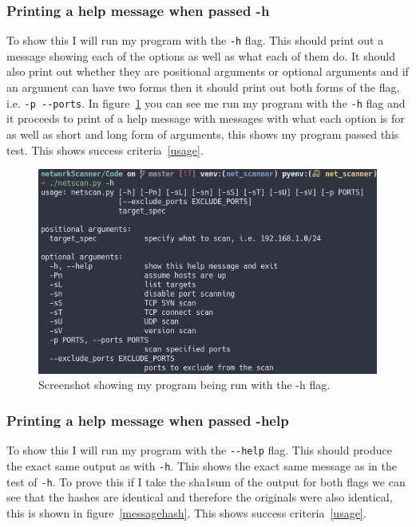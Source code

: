 \documentclass[titlepage]{article}
\let\Oldsubsubsection\subsubsection{}
\renewcommand{\subsubsection}{\FloatBarrier\Oldsubsubsection}
\begin{document}
\subsubsection{Printing a help message when passed -h}

To show this I will run my program with the \verb|-h| flag.
This should print out a message showing each of the options as well as what each of them do.
It should also print out whether they are positional arguments or optional arguments and if
an argument can have two forms then it should print out both forms of the flag, i.e. \verb|-p --ports|.
In figure~\ref{hflagtest} you can see me run my program with the \verb|-h| flag and it proceeds to
print of a help message with messages with what each option is for as well as short and long form of
arguments, this shows my program passed this test.
This shows success criteria~\ref{usage}.

\begin{figure}[H]
  \centering
  \includegraphics[width=\textwidth]{screenshots/hmessage.png}
  \caption{%
    Screenshot showing my program being run with the -h flag.
  }\label{hflagtest}
\end{figure}

\subsubsection{Printing a help message when passed -help}
To show this I will run my program with the \verb|--help| flag.
This should produce the exact same output as with \verb|-h|.
This shows the exact same message as in the test of \verb|-h|.
To prove this if I take the sha1sum of the output for both flags we can see
that the hashes are identical and therefore the originals were also identical,
this is shown in figure~\ref{messagehash}.
This shows success criteria~\ref{usage}.
\end{document}
